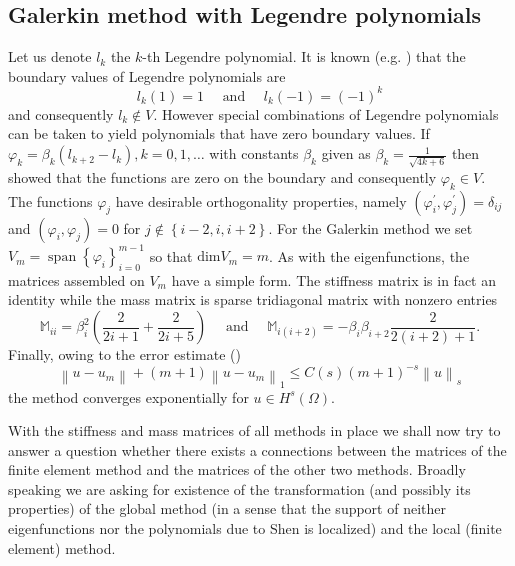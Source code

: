\documentclass[a4paper,10pt]{article}
\newcommand{\norm}[1]{\ensuremath{\left\|#1\right\|}}
\newcommand{\inner}[2]{\ensuremath{\left(#1, #2\right)}}
\newcommand{\Mmat}{\ensuremath{\mathbb{M}}}
\DeclareMathOperator{\spn}{span}
\begin{document}
  \subsection{Galerkin method with Legendre polynomials}
  Let us denote $l_k$ the $k$-th Legendre polynomial. It is known
  (e.g. \cite{shen_book}) that the boundary values of Legendre polynomials are
  \[
    l_k(1) = 1\quad\text{ and }\quad l_k(-1) = (-1)^k
  \]
  and consequently $l_k\notin V$. However special combinations of Legendre
  polynomials can be taken to yield polynomials that have zero boundary values.
  If $\varphi_k=\beta_k\left(l_{k+2} - l_k\right), k=0, 1,\dots$ with constants
  $\beta_k$ given as $\beta_k = \frac{1}{\sqrt{4k + 6}}$ then
  \cite{shen_leg} showed that the functions are zero on the boundary and
  consequently $\varphi_k\in V$. The functions $\varphi_j$ have desirable
  orthogonality properties, namely
  $\inner{\varphi_i^{\prime}}{\varphi_j^{\prime}}=\delta_{ij}$ and
  $\inner{\varphi_i}{\varphi_j}=0$ for $j\notin\left\{i-2, i, i+2\right\}$.
  For the Galerkin method we set $V_m=\spn\left\{\varphi_i\right\}_{i=0}^{m-1}$
  so that $\text{dim}V_m=m$. As with the eigenfunctions, the matrices assembled
  on $V_m$ have a simple form. The stiffness matrix is in fact an identity
  while the mass matrix is sparse tridiagonal matrix with nonzero entries
  \[
    \Mmat_{ii} = \beta_i^2\left(\frac{2}{2i+1}+\frac{2}{2i+5}\right)
    \quad{\text{ and }}\quad
    \Mmat_{i(i+2)} = -\beta_i\beta_{i+2}\frac{2}{2(i+2)+1}.
  \]
  Finally, owing to the error estimate (\cite{shen_leg})
  \[
    \norm{u-u_m} + (m+1)\norm{u-u_m}_1 \leq C(s)(m+1)^{-s}\norm{u}_s
  \]
  the method converges exponentially for $u\in H^s\left({\Omega}\right)$.

  With the stiffness and mass matrices of all methods in place we shall now
  try to answer a question whether there exists a connections between the
  matrices of the finite element method and the matrices of the other two
  methods. Broadly speaking we are asking for existence of the transformation
  (and possibly its properties) of the global method (in a sense that the
  support of neither eigenfunctions nor the polynomials due to Shen is localized)
  and the local (finite element) method.

\end{document}
